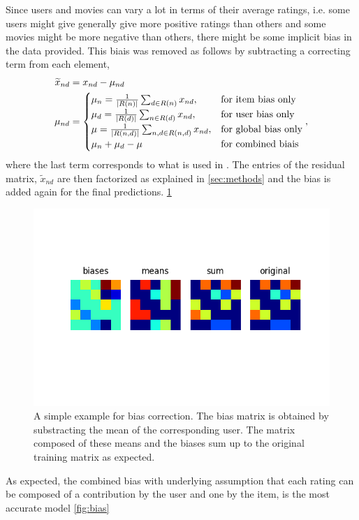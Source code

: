 Since users and movies can vary a lot in terms of their average ratings, i.e. some
users might give generally give more positive ratings than others and some
movies might be more negative than others, there might be some implicit bias in
the data provided. 
This biais was removed as follows by subtracting a correcting term from each
element,
\begin{align}
  \widetilde{x}_{nd} &= x_{nd}-\mu_{nd} \\
  \mu_{nd} &=
 \begin{cases}
  \mu_{n} = \frac{1}{|R(n)|} \sum_{d \in R(n)} x_{nd}, &\text{for item bias only}   \\
\mu_{d} = \frac{1}{|R(d)|} \sum_{n \in R(d)} x_{nd}, &\text{for user bias only} \\
\mu = \frac{1}{|R(n,d)|}\sum_{n,d \in R(n,d)} x_{nd}, &\text{for global bias only}
   \\
  \mu_{n} + \mu_{d} - \mu &\text{for combined biais}
 \end{cases}, 
\end{align}
where the last term corresponds to what is used in \cite{Koren2009}. 
The entries of the residual matrix, $\widetilde{x}_{nd}$ are then factorized as explained
in \ref{sec:methods} and the bias is added again for the final predictions.
\ref{fig:matrix}

\begin{figure}[htbp]
  \centering
  \includegraphics[width=.7\columnwidth]{figures/biases_user.png}
  \vspace{-3mm}
  \caption{A simple example for bias correction. The bias matrix is obtained by
  substracting the mean of the corresponding user. The matrix composed of these
  means and the biases sum up to the original training matrix as expected.}
  \label{fig:matrix}
\end{figure}

As expected, the combined bias with underlying assumption that each rating can
  be composed of a contribution by the user and one by the item, is the most
  accurate model \ref{fig:bias} 


